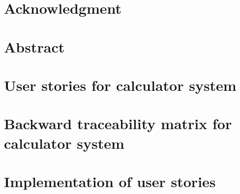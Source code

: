 \documentclass[a4paper,12pt]{report}
\begin{document}


\newpage

\newpage
{}

 \chapter*{\centering Acknowledgment}


\newpage
{}
\chapter*{\centering Abstract}


\newpage
{}
\tableofcontents

\newpage
{}
\chapter{User stories for calculator system} 


\chapter{Backward traceability matrix for calculator system} 


\chapter{Implementation of user stories}





\end{document}
